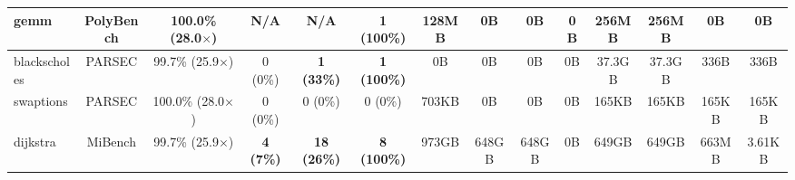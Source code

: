 {\begin{tabular}{|l|c|c||c|c||c||c|c|c|c||c|c|c|c|}
\hline
gemm     & PolyBench  & 100.0\% (28.0$\times$) & N/A & N/A & \textbf{1 (100\%)} &
         128MB & 0B & 0B & 0B & 256MB & 256MB & 0B & 0B \\ %
\hline
blackscholes & PARSEC & 99.7\% (25.9$\times$) & 0 (0\%) & \textbf{1 (33\%)} & \textbf{1 (100\%)} &
             0B & 0B & 0B & 0B & 37.3GB & 37.3GB & 336B & 336B \\ %
\hline
swaptions & PARSEC & 100.0\% (28.0$\times$)  & 0 (0\%) & 0 (0\%) & 0 (0\%) &
          703KB & 0B & 0B & 0B & 165KB & 165KB & 165KB & 165KB \\ %
\hline
dijkstra & MiBench  & 99.7\% (25.9$\times$) & \textbf{4 (7\%)} & \textbf{18 (26\%)} & \textbf{8 (100\%)} &
         973GB & 648GB & 648GB & 0B & 649GB & 649GB & 663MB & 3.61KB \\ %
\hline
\end{tabular}
}
